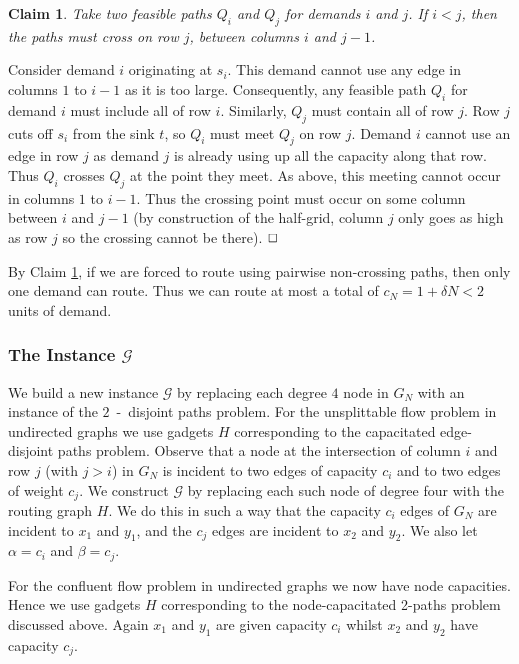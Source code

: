 \documentclass[12pt]{article}
\def\a{\alpha}
\def\b{\beta}
\newtheorem{claim}{Claim}[section]
\newcommand{\qed}{$\hfill{\Box}$}
\newcommand{\capp}[1]{c_{#1}}
\begin{document}
\begin{claim}\label{cl:cross}
Take two feasible paths $Q_i$ and $Q_j$ for demands $i$ and $j$.
If $i<j$, then the paths must cross on row $j$, between columns $i$ and $j-1$.
\end{claim}
Consider demand $i$ originating at $s_i$. This demand cannot
use any edge in columns $1$ to $i-1$ as it is too large.
Consequently, any feasible path $Q_i$ for demand $i$ must include all of row $i$.
Similarly, $Q_j$ must contain all of row $j$. Row $j$ cuts off $s_i$ from the sink $t$, so
$Q_i$ must meet $Q_j$ on row $j$.
Demand $i$ cannot use an edge in row $j$ as demand $j$ is already using up all the capacity along that row.
Thus $Q_i$ crosses $Q_j$ at the point they meet. As above, this meeting cannot occur
in columns $1$ to $i-1$. Thus the crossing point must occur on some column between $i$ and $j-1$
(by construction of the half-grid, column $j$ only goes as high as row $j$ so the crossing cannot be there).
\qed


By Claim \ref{cl:cross}, if we are forced to route using pairwise non-crossing paths, then only one demand
can route. Thus we can route at most a total of $\capp{N}=1+\delta N<2$ units of demand.

\subsubsection{The Instance $\mathcal{G}$}
We build a new instance $\mathcal{G}$ by replacing each degree $4$ node in $G_N$ with an instance
of the $2$~-~disjoint paths problem.
For the unsplittable flow problem in undirected graphs we use gadgets $H$ corresponding to
the capacitated edge-disjoint paths problem. Observe that a
node at the intersection of column $i$ and row $j$ (with $j > i$) in $G_N$ is incident to two edges of capacity
$\capp{i}$ and to two edges of weight $\capp{j}$.  We
construct  $\mathcal{G}$ by replacing each such node of degree four with
the routing graph $H$. We do this in such a way that the capacity $\capp{i}$
edges of $G_N$ are incident to $x_1$ and $y_1$, and the  $\capp{j}$
edges are incident to $x_2$ and $y_2$.
We also let $\a=\capp{i}$ and $\b=\capp{j}$.

For the confluent flow problem in undirected graphs we now have node capacities. Hence we use gadgets $H$ corresponding to
the node-capacitated 2-paths problem discussed above.
Again $x_1$ and $y_1$ are given
capacity $\capp{i}$ whilst $x_2$ and $y_2$ have capacity $\capp{j}$.
\end{document}
